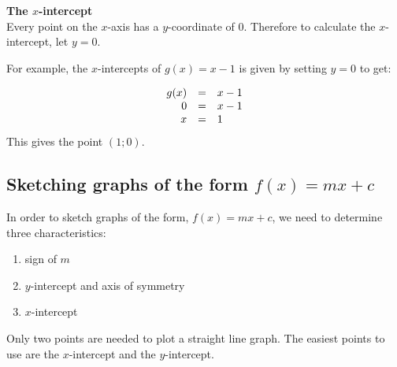 \textbf{The $x$-intercept}\\
Every point on the $x$-axis has a $y$-coordinate of $0$. Therefore to calculate the $x$-intercept, let $y=0$. \par
For example, the $x$-intercepts of $g(x)=x-1$ is given by setting $y=0$ to get:\par 

\begin{equation*}
\begin{array}{ccl}\hfill g(x)& =& x-1\hfill \\
\hfill 0& =& x-1\hfill \\
\hfill x& =& 1\hfill 
\end{array}
\end{equation*}
This gives the point $(1;0)$.


\subsection*{Sketching graphs of the form $f(x)=mx+c$}


In order to sketch graphs of the form, $f(x)=mx+c$, we need to determine three characteristics:\par 
\begin{enumerate}[noitemsep, label=\textbf{\arabic*}. ] 
\item sign of $m$
\item $y$-intercept
 and axis of symmetry\item $x$-intercept
\end{enumerate}
Only two points are needed to plot a straight line graph. The easiest points to use are the $x$-intercept and the $y$-intercept.\par 

